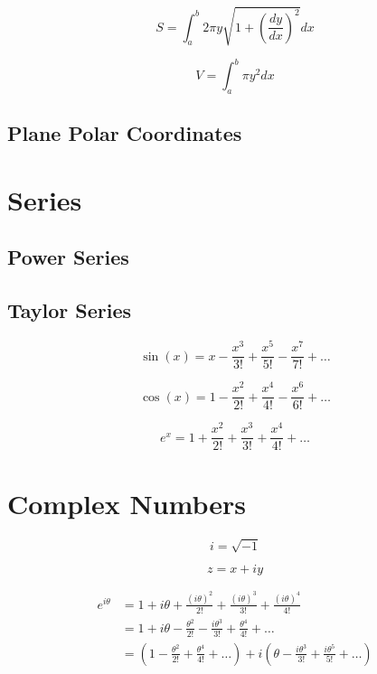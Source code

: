 \documentclass[]{report}
\begin{document}
\begin{equation*}
    S = \int_{a}^{b} 2 \pi y \sqrt{1 + \left(\frac{dy}{dx}\right)^{2}}dx
\end{equation*}

\begin{equation*}
    V = \int_{a}^{b} \pi y^{2} dx
\end{equation*}

\section{Plane Polar Coordinates}

\chapter{Series}

\section{Power Series}

\section{Taylor Series}

\begin{equation*}
    \sin(x) = x - \frac{x^{3}}{3!} + \frac{x^{5}}{5!} - \frac{x^{7}}{7!} + \dots
\end{equation*}

\begin{equation*}
    \cos(x) = 1 - \frac{x^{2}}{2!} + \frac{x^{4}}{4!} - \frac{x^{6}}{6!} + \dots
\end{equation*}

\begin{equation*}
    e^{x} = 1 + \frac{x^{2}}{2!} + \frac{x^{3}}{3!} + \frac{x^{4}}{4!} + \dots
\end{equation*}
\chapter{Complex Numbers}

\begin{equation*}
    i = \sqrt{-1}
\end{equation*}

\begin{equation*}
    z = x + iy
\end{equation*}

\begin{align*}
    e^{i\theta} &= 1 + i\theta + \frac{(i\theta)^{2}}{2!} + \frac{(i\theta)^{3}}{3!} + \frac{(i\theta)^{4}}{4!}\\
    &= 1 + i\theta - \frac{\theta^{2}}{2!} - \frac{i\theta^{3}}{3!} + \frac{\theta^{4}}{4!} + \dots\\
    &= \left(1 - \frac{\theta^{2}}{2!} + \frac{\theta^{4}}{4!} + \dots\right) + i\left(\theta - \frac{i\theta^{3}}{3!} + \frac{i\theta^{5}}{5!} + \dots\right)
\end{align*}
\end{document}
